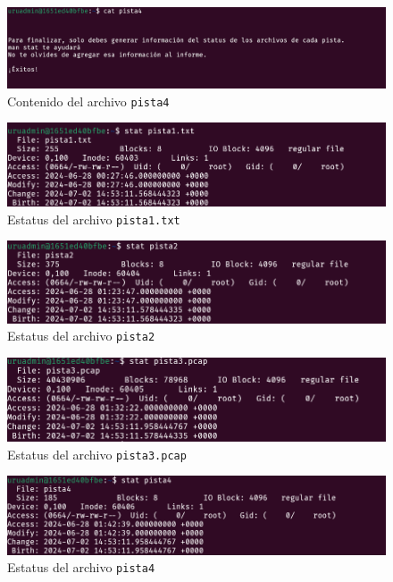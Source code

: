 \documentclass{article}
\begin{document}
\begin{figure}[ht!]
  \includegraphics[width=\textwidth]{pista4.png}
  \caption{Contenido del archivo \texttt{pista4}}
  \label{fig:pista4}
\end{figure}


\begin{figure}[ht!]
  \includegraphics[width=\textwidth]{pista1_stat.png}
  \caption{Estatus del archivo \texttt{pista1.txt}}
  \label{fig:pista1_stat}
\end{figure}

\begin{figure}[ht!]
  \includegraphics[width=\textwidth]{pista2_stat.png}
  \caption{Estatus del archivo \texttt{pista2}}
  \label{fig:pista2_stat}
\end{figure}

\begin{figure}[ht!]
  \includegraphics[width=\textwidth]{pista3_stat.png}
  \caption{Estatus del archivo \texttt{pista3.pcap}}
  \label{fig:pista3_stat}
\end{figure}

\begin{figure}[ht!]
  \includegraphics[width=\textwidth]{pista4_stat.png}
  \caption{Estatus del archivo \texttt{pista4}}
  \label{fig:pista4_stat}
\end{figure}
\end{document}
